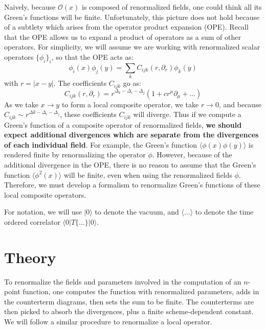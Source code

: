 \documentclass[11pt, oneside]{article}   	%
\theoremstyle{definition}
\begin{document}
Naively, because $\mathcal O(x)$ is composed of renormalized fields, one could think all its Green's functions will be 
finite. Unfortunately, this picture does not hold because of a subtlety which arises from the operator product expansion 
(OPE). Recall that the OPE allows us to expand a product of operators as a sum of other operators. For simplicity, we 
will assume we are working with renormalized scalar operators $\{\phi_i\}_{i}$, so that the OPE acts as:
\begin{equation}
	\phi_i(x)\phi_j(y) = \sum_k C_{ijk}(r, \partial_r) \phi_k(y)
\end{equation}
with $r = |x - y|$. The coefficients $C_{ijk}$ go as:
\begin{equation}
	C_{ijk}(r, \partial_r) = r^{\Delta_k - \Delta_i - \Delta_j}\left(1 + c r^\mu \partial_\mu + ...\right)
\end{equation}
As we take $x\rightarrow y$ to form a local composite operator, we take $r\rightarrow 0$, and because $C_{ijk}\sim 
r^{\Delta k - \Delta_i - \Delta_j}$, these coefficients $C_{ijk}$ will diverge. Thus if we compute a Green's function of 
a composite operator of renormalized fields, \textbf{we should expect additional divergences which are separate from 
the divergences of each individual field}. For example, the Green's function 
$\langle \phi(x)\phi(y)\rangle$ is rendered finite by renormalizing the operator $\phi$. However, because of the 
additional divergence in the OPE, there is no reason to assume that the Green's function $\langle\phi^2(x)\rangle$ 
will be finite, even when using the renormalized fields $\phi$. Therefore, we must develop a formalism to renormalize 
Green's functions of these local composite operators. 

For notation, we will use $|0\rangle$ to denote the vacuum, and $\langle ... \rangle$ to denote the time ordered 
correlator $\langle 0 | T\{...\} | 0\rangle$. 

\section{Theory}

To renormalize the fields and parameters involved in the computation of an $n$-point function, one computes the 
function with renormalized parameters, adds in the counterterm diagrams, then sets the sum to be finite. The 
counterterms are then picked to absorb the divergences, plus a finite scheme-dependent constant. We will follow a 
similar procedure to renormalize a local operator.
\end{document}
